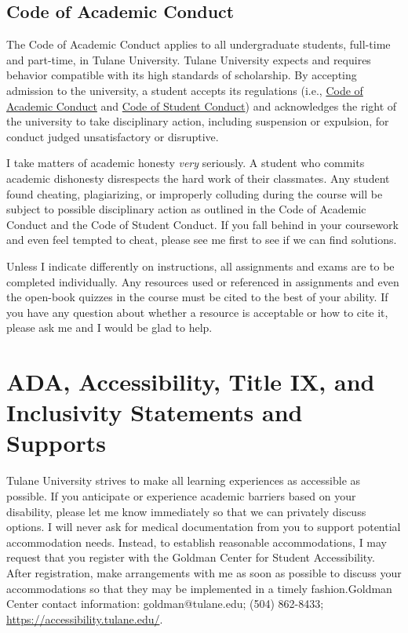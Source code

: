 \documentclass[11pt,letterpaper,final]{article}
\begin{document}
\subsection{Code of Academic Conduct} 
The Code of Academic Conduct applies to all undergraduate students, full-time and part-time, in Tulane University. Tulane University expects and requires behavior compatible with its high standards of scholarship. By accepting admission to the university, a student accepts its regulations (i.e., \href{https://college.tulane.edu/code-of-academic-conduct}{Code of Academic Conduct} and \href{https://conduct.tulane.edu/resources/code-student-conduct}{Code of Student Conduct}) and acknowledges the right of the university to take disciplinary action, including suspension or expulsion, for conduct judged unsatisfactory or disruptive.

I take matters of academic honesty \textit{very} seriously. A student who commits academic dishonesty disrespects the hard work of their classmates. Any student found cheating, plagiarizing, or improperly colluding during the course will be subject to possible disciplinary action as outlined in the Code of Academic Conduct and the Code of Student Conduct. If you fall behind in your coursework and even feel tempted to cheat, please see me first to see if we can find solutions.

Unless I indicate differently on instructions, all assignments and exams are to be completed individually. Any resources used or referenced in assignments and even the open-book quizzes in the course must be cited to the best of your ability. If you have any question about whether a resource is acceptable or how to cite it, please ask me and I would be glad to help. 

\section{ADA, Accessibility, Title IX, and Inclusivity Statements and Supports} 
Tulane University strives to make all learning experiences as accessible as possible. If you anticipate or experience academic barriers based on your disability, please let me know immediately so that we can privately discuss options. I will never ask for medical documentation from you to support potential accommodation needs. Instead, to establish reasonable accommodations, I may request that you register with the Goldman Center for Student Accessibility. After registration, make arrangements with me as soon as possible to discuss your accommodations so that they may be implemented in a timely fashion.Goldman Center contact information: goldman@tulane.edu; (504) 862-8433; \url{https://accessibility.tulane.edu/}. 
\end{document}
